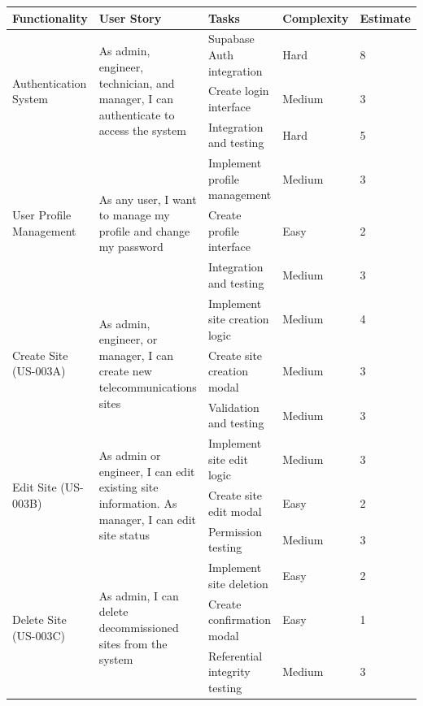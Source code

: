 \begin{table}[H]
\centering
\small
\begin{tabular}{|p{2.5cm}|p{4cm}|p{3.2cm}|p{2.2cm}|p{1.5cm}|}
\hline
\textbf{Functionality} & \textbf{User Story} & \textbf{Tasks} & \textbf{Complexity} & \textbf{Estimate} \\
\hline

\multirow{3}{2.5cm}{Authentication System} & 
\multirow{3}{4cm}{As admin, engineer, technician, and manager, I can authenticate to access the system}
& Supabase Auth integration & Hard & 8 \\
\cline{3-5}
& & Create login interface & Medium & 3 \\
\cline{3-5}
& & Integration and testing & Hard & 5 \\
\hline

\multirow{3}{2.5cm}{User Profile Management} & 
\multirow{3}{4cm}{As any user, I want to manage my profile and change my password}
& Implement profile management & Medium & 3 \\
\cline{3-5}
& & Create profile interface & Easy & 2 \\
\cline{3-5}
& & Integration and testing & Medium & 3 \\
\hline

\multirow{3}{2.5cm}{Create Site (US-003A)} & 
\multirow{3}{4cm}{As admin, engineer, or manager, I can create new telecommunications sites}
& Implement site creation logic & Medium & 4 \\
\cline{3-5}
& & Create site creation modal & Medium & 3 \\
\cline{3-5}
& & Validation and testing & Medium & 3 \\
\hline

\multirow{3}{2.5cm}{Edit Site (US-003B)} & 
\multirow{3}{4cm}{As admin or engineer, I can edit existing site information. As manager, I can edit site status}
& Implement site edit logic & Medium & 3 \\
\cline{3-5}
& & Create site edit modal & Easy & 2 \\
\cline{3-5}
& & Permission testing & Medium & 3 \\
\hline

\multirow{3}{2.5cm}{Delete Site (US-003C)} & 
\multirow{3}{4cm}{As admin, I can delete decommissioned sites from the system}
& Implement site deletion & Easy & 2 \\
\cline{3-5}
& & Create confirmation modal & Easy & 1 \\
\cline{3-5}
& & Referential integrity testing & Medium & 3 \\
\hline


\end{tabular}
\end{table}
